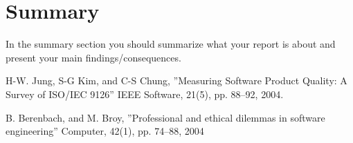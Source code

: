 \documentclass[conference]{IEEEtran}
\begin{document}
\section{Summary}
In the summary section you should summarize what your report is about and present your main findings/consequences. 


\begin{thebibliography}{1}
H-W. Jung, S-G Kim, and C-S Chung, ''Measuring Software Product Quality: A Survey of ISO/IEC 9126'' IEEE Software, 21(5), pp. 88–92, 2004.

B. Berenbach, and M. Broy, ''Professional and ethical dilemmas in software engineering'' Computer, 42(1), pp. 74–88, 2004

\end{thebibliography}
\end{document}
